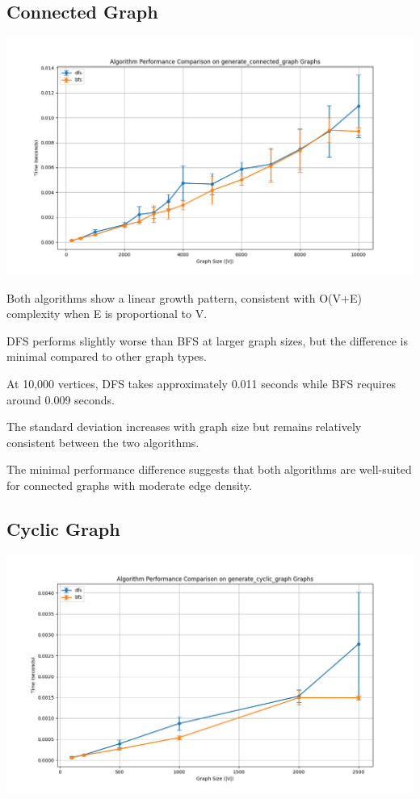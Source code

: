 \documentclass[a4paper,12pt]{article}
\begin{document}
\subsection{Connected Graph}
\label{sec:orgaf84068}
\begin{center}
\includegraphics[width=.9\linewidth]{dfs_connected.png}
\label{orgef1528f}
\end{center}

Both algorithms show a linear growth pattern, consistent with O(V+E) complexity when E is proportional to V.

DFS performs slightly worse than BFS at larger graph sizes, but the difference is minimal compared to other graph types.

At 10,000 vertices, DFS takes approximately 0.011 seconds while BFS requires around 0.009 seconds.

The standard deviation increases with graph size but remains relatively consistent between the two algorithms.

The minimal performance difference suggests that both algorithms are well-suited for connected graphs with moderate edge density.
\subsection{Cyclic Graph}
\label{sec:org7ffd6e1}
\begin{center}
\includegraphics[width=.9\linewidth]{dfs_cyclic.png}
\label{orgd373a87}
\end{center}
\end{document}
